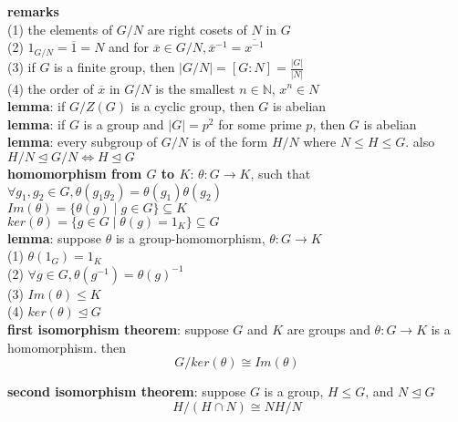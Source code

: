 \documentclass[a4paper]{article}
\newcommand\abs[1]{\ensuremath{\lvert#1\rvert}}
\begin{document}
\begin{multicols}{2}
\begin{framed}
	\noindent
	\textbf{remarks}\\
	(1) the elements of $G/N$ are right cosets of $N$ in $G$\\
	(2) $1_{G/N} = \overline{1} = N$ and for $\overline{x} \in G/N, \overline{x}^{-1} = \overline{x^{-1}}$\\
	(3) if $G$ is a finite group, then $\abs{G/N} = [G:N] = \frac{\abs{G}}{\abs{N}}$\\
	(4) the order of $\overline{x}$ in $G/N$ is the smallest $n \in \mathbb{N}$, $x^n \in N$\\
	
	\noindent
	\textbf{lemma}: if $G / Z(G)$ is a cyclic group, then $G$ is abelian\\
	
	\noindent
	\textbf{lemma}: if $G$ is a group and $\abs{G} = p^2$ for some prime $p$, then $G$ is abelian\\
	
	\noindent
	\textbf{lemma}: every subgroup of $G / N$ is of the form $H / N$ where $N \leq H \leq G$. also $H / N \unlhd G /N \iff H \unlhd G$\\
	
	\noindent
	\textbf{homomorphism from $G$ to $K$}: $\theta: G \rightarrow K$, such that $\forall g_1, g_2 \in G, \theta(g_1 g_2) = \theta(g_1)\theta(g_2)$\\
	$Im(\theta) = \{\theta(g) \; \vert \; g \in G\} \subseteq K$\\
	$ker(\theta) = \{g \in G \; \vert \; \theta(g) = 1_K\} \subseteq G$\\
	
	\noindent
	\textbf{lemma}: suppose $\theta$ is a group-homomorphism, $\theta: G \rightarrow K$\\
	(1) $\theta(1_G) = 1_K$\\
	(2) $\forall g \in G, \theta(g^{-1}) = \theta(g)^{-1}$\\
	(3) $Im(\theta) \leq K$\\
	(4) $ker(\theta) \unlhd G$\\
	
	\noindent
	\textbf{first isomorphism theorem}: suppose $G$ and $K$ are groups and $\theta: G \rightarrow K$ is a homomorphism. then 
	$$G / ker(\theta) \cong Im(\theta)$$
	
	\noindent
	\textbf{second isomorphism theorem}: suppose $G$ is a group, $H \leq G$, and $N \unlhd G$
	$$H / (H \cap N) \cong NH / N$$

\end{framed}


\end{multicols}
\end{document}
